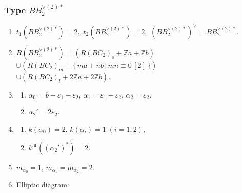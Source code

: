 \documentclass[11pt]{amsart}
\newcommand{\Z}{\mathbb{Z}}
\newcommand{\nr}{\mathrm{nr}}
\newcommand{\vep}{\varepsilon}
\begin{document}
{\subsubsection{Type $BB_2^{\vee (2) \ast}$}\label{data:BB-4}
\begin{enumerate}
\item $t_1(BB_2^{\vee (2)\ast})=2,$ \quad $t_2(BB_2^{\vee (2)\ast})=2,$ \quad $(BB_2^{\vee (2)\ast})^\vee = BB_2^{\vee (2)\ast}.$
\item $R(BB_2^{\vee (2)\ast})=(R(BC_2)_s+\Z a+\Z b)$ \\
$\cup (R(BC_2)_m+\{\, ma+nb\, \vert\, mn \equiv 0\, [2]\, \})$ \\
$\cup (R(BC_2)_l+2\Z a+2\Z b)$. 
\item 
\begin{enumerate}
\item[i)] $\alpha_0=b-\vep_1-\vep_2$, $\alpha_1=\vep_1-\vep_2$, $\alpha_2=\vep_2$. 
\item[ii)] $\alpha_2'=2\vep_2$.
\end{enumerate}
\item 
\begin{enumerate}
\item[i)] $k(\alpha_0)=2$, \; $k(\alpha_i)=1\; (i=1,2)$, 
\item[ii)] $k^{\nr}((\alpha_2')^\ast)=2$. 
\end{enumerate}
\item $m_{\alpha_0}=1$, \; $m_{\alpha_1}=m_{\alpha_2}=2$.
\item Elliptic diagram:




\begin{center}
\end{center}
\end{enumerate}}
\end{document}
